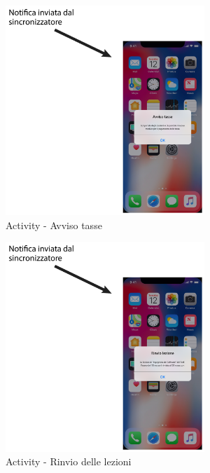 \begin{figure}
	\centering
	\includegraphics[width=0.67\textwidth]{imgs/gruppo2/activity-notifiche-avviso-tasse}
	\caption{Activity - Avviso tasse}
	\label{fig:activity-notifiche-avviso-tasse}
\end{figure}

\begin{figure}
	\centering
	\includegraphics[width=0.67\textwidth]{imgs/gruppo2/activity-notifiche-rinvio-lezioni}
	\caption{Activity - Rinvio delle lezioni}
	\label{fig:activity-notifiche-rinvio-lezioni}
\end{figure}

